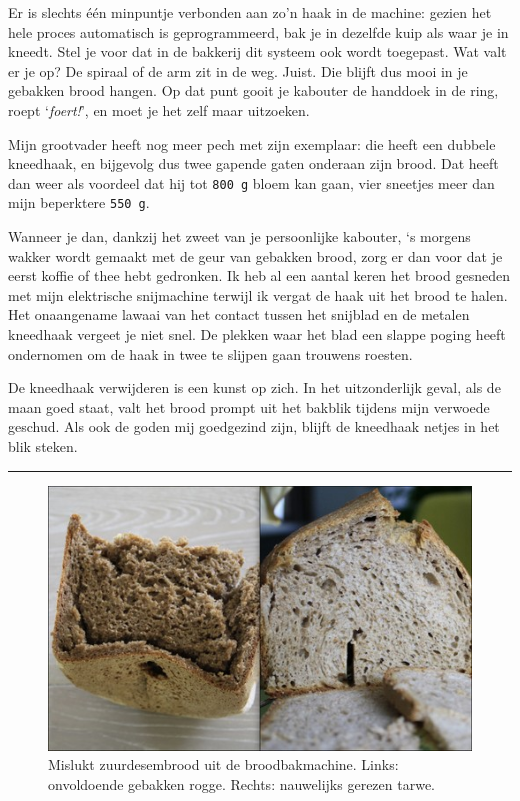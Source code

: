 \documentclass[
  11pt,
  dutch,
]{memoir}
\begin{document}
Er is slechts één minpuntje verbonden aan zo'n haak in de machine:
gezien het hele proces automatisch is geprogrammeerd, bak je in dezelfde
kuip als waar je in kneedt. Stel je voor dat in de bakkerij dit systeem
ook wordt toegepast. Wat valt er je op? De spiraal of de arm zit in de
weg. Juist. Die blijft dus mooi in je gebakken brood hangen. Op dat punt
gooit je kabouter de handdoek in de ring, roept `\emph{foert!}', en moet
je het zelf maar uitzoeken.

Mijn grootvader heeft nog meer pech met zijn exemplaar: die heeft een
dubbele kneedhaak, en bijgevolg dus twee gapende gaten onderaan zijn
brood. Dat heeft dan weer als voordeel dat hij tot \texttt{800\ g} bloem
kan gaan, vier sneetjes meer dan mijn beperktere \texttt{550\ g}.

Wanneer je dan, dankzij het zweet van je persoonlijke kabouter, `s
morgens wakker wordt gemaakt met de geur van gebakken brood, zorg er dan
voor dat je eerst koffie of thee hebt gedronken. Ik heb al een aantal
keren het brood gesneden met mijn elektrische snijmachine terwijl ik
vergat de haak uit het brood te halen. Het onaangename lawaai van het
contact tussen het snijblad en de metalen kneedhaak vergeet je niet
snel. De plekken waar het blad een slappe poging heeft ondernomen om de
haak in twee te slijpen gaan trouwens roesten.

De kneedhaak verwijderen is een kunst op zich. In het uitzonderlijk
geval, als de maan goed staat, valt het brood prompt uit het bakblik
tijdens mijn verwoede geschud. Als ook de goden mij goedgezind zijn,
blijft de kneedhaak netjes in het blik steken.

\pfbreak

\begin{figure}
    \centering
    \includegraphics{img/bw/machinefout.JPG}
    \caption[Mislukt zuurdesembrood.]{Mislukt zuurdesembrood uit de broodbakmachine. Links:
    onvoldoende gebakken rogge. Rechts: nauwelijks gerezen tarwe.}
\end{figure}
\end{document}
